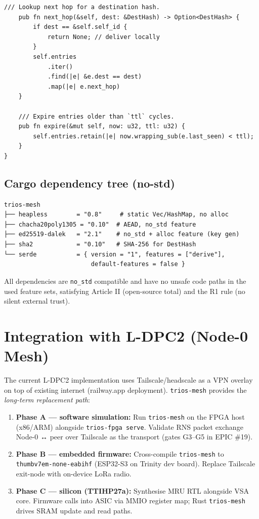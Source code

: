 \begin{lstlisting}[caption={\texttt{crates/trios-mesh/src/lib.rs} --- public API sketch (Rust)}]
    /// Lookup next hop for a destination hash.
    pub fn next_hop(&self, dest: &DestHash) -> Option<DestHash> {
        if dest == &self.self_id {
            return None; // deliver locally
        }
        self.entries
            .iter()
            .find(|e| &e.dest == dest)
            .map(|e| e.next_hop)
    }

    /// Expire entries older than `ttl` cycles.
    pub fn expire(&mut self, now: u32, ttl: u32) {
        self.entries.retain(|e| now.wrapping_sub(e.last_seen) < ttl);
    }
}
\end{lstlisting}

\subsection{Cargo dependency tree (no-std)}

\begin{verbatim}
trios-mesh
├── heapless        = "0.8"     # static Vec/HashMap, no alloc
├── chacha20poly1305 = "0.10"  # AEAD, no_std feature
├── ed25519-dalek   = "2.1"    # no_std + alloc feature (key gen)
├── sha2            = "0.10"   # SHA-256 for DestHash
└── serde           = { version = "1", features = ["derive"],
                        default-features = false }
\end{verbatim}

All dependencies are \texttt{no\_std} compatible and have no unsafe
code paths in the used feature sets, satisfying Article II
(open-source total) and the R1 rule (no silent external trust).

\section{Integration with L-DPC2 (Node-0 Mesh)}

The current L-DPC2 implementation uses Tailscale/headscale as a
VPN overlay on top of existing internet (railway.app deployment).
\texttt{trios-mesh} provides the \emph{long-term replacement path}:

\begin{enumerate}
  \item \textbf{Phase A — software simulation:}
        Run \texttt{trios-mesh} on the FPGA host (x86/ARM) alongside
        \texttt{trios-fpga serve}.
        Validate RNS packet exchange Node-0 ↔ peer over Tailscale
        as the transport (gates G3–G5 in EPIC \#19).
  \item \textbf{Phase B — embedded firmware:}
        Cross-compile \texttt{trios-mesh} to \texttt{thumbv7em-none-eabihf}
        (ESP32-S3 on Trinity dev board).
        Replace Tailscale exit-node with on-device LoRa radio.
  \item \textbf{Phase C — silicon (TTIHP27a):}
        Synthesise MRU RTL alongside VSA core.
        Firmware calls into ASIC via MMIO register map; Rust
        \texttt{trios-mesh} drives SRAM update and read paths.
\end{enumerate}

